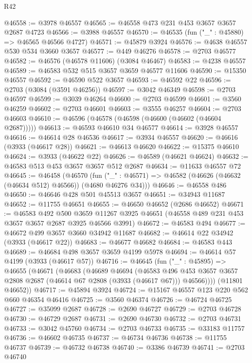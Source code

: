 \begin{lexlean}{R42}
\begin{coremodule}
@46558 := @3978 @46557
@46565 := @46558 @473 @231 @453 @3657 @3657 @2687 @4723
@46566 := @3988 @46557
@46570 := @46535 (fun ("_" : @45880) => @46565 @46566 @4727)
@46571 := @45879 @3924
@46576 := @4638 @46557 @530 @534 @3660 @3657
@46577 := @449 @46276
@46578 := @2703 @46577
@46582 := @46576 (@46578 @11606) (@3084 @46467)
@46583 := @4238 @46557
@46589 := @46583 @532 @515 @3657 @3659 @46577 @11606
@46590 := @15350 @46557
@46592 := @46590 @522 @3657
@46593 := @46592 @22
@46596 := @2703 (@3084 (@3591 @46256))
@46597 := @3042 @46349
@46598 := @2703 @46597
@46599 := @3039 @46264
@46600 := @2703 @46599
@46601 := @3560 @46259
@46602 := @2703 @46601
@46603 := @3555 @46257
@46604 := @2703 @46603
@46610 := @46596 (@46578 (@46598 (@46600 (@46602 (@46604 @2687)))))
@46613 := @46593 @46610 @34 @46577
@46614 := @3928 @46557
@46616 := @46614 @28 @46536
@46617 := @3934 @46557
@46620 := @46616 (@3933 (@46617 @28))
@46621 := @46613 @46620
@46622 := @15375 @46610
@46624 := @3933 (@46622 @22)
@46626 := @46589 (@46621 @46624)
@46632 := @46583 @513 @453 @3657 @3657 @512 @2687
@46634 := @11633 @46557 @72
@46645 := @46458
    (@46570
      (fun ("_" : @46571) => @46582 (@46626 (@46632 (@46634 @512) @46566)) (@4680 @46276 @34)))
@46646 := @46558 @486
@46650 := @46646 @428 @501 @45513 @3657
@46651 := @34943 @11687
@46652 := @11755 @46651
@46655 := @46650 @46652 (@2686 @46652)
@46671 := @46583
    @492
    @500
    @3659
    @11267
    @3925
    @46651
    (@46558 @489 @231 @453 @3657 @3657 @2687 @3925 @46566 @3991)
@46672 := @46583 @494
@46677 := @46672 @499 @3657 @3660 @34942 @11687
@46682 := @46614 @22 @34942 (@3933 (@46617 @22))
@46683 := @46677 @46682
@46684 := @46583 @443
@46689 := @46684 @498 @3657 @3659 @4199 @5978
@46694 := @46614 @57 @4199 (@3933 (@46617 @57))
@46716 := @46645
    (fun ("_" : @45895) =>
    @46655
      (@46671
        (@46683
          (@46689
            @46694
            (@46583
              @496
              @453
              @3657
              @3657
              @2808
              @2687
              (@46614 @67 @2808 (@3933 (@46617 @67)))
              @46566))))
      (@11801 @46652))
@46717 := @45894 @3924
@46724 := @15167 @46557 @123 @220 @562 @660 @46354 @46416
@46725 := @3560 @46374
@46726 := @46724 @46725
@46727 := @35099 @2687
@46728 := @2690 @46727
@46729 := @2703 @46728
@46730 := @46729 @2687
@46731 := @2690 @46730
@46732 := @2703 @46731
@46733 := @3042 @45760
@46734 := @2703 @46733
@46735 := @33183 @11757
@46736 := @46602 @46735
@46737 := @46734 @46736
@46738 := @11755 @46737
@46739 := @46732 @46738
@46740 := @3386 @46739
@46741 := @2703 @46740

\end{coremodule}
\end{lexlean}

